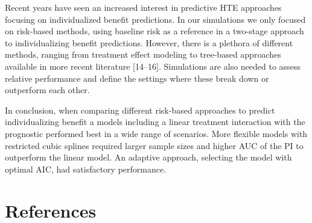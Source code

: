 \documentclass{article}
\begin{document}
Recent years have seen an increased interest in predictive HTE
approaches focusing on individualized benefit predictions. In our
simulations we only focused on risk-based methods, using baseline risk
as a reference in a two-stage approach to individualizing benefit
predictions. However, there is a plethora of different methods, ranging
from treatment effect modeling to tree-based approaches available in
more recent literature {[}14--16{]}. Simulations are also needed to
assess relative performance and define the settings where these break
down or outperform each other.

In conclusion, when comparing different risk-based approaches to predict
individualizing benefit a models including a linear treatment
interaction with the prognostic performed best in a wide range of
scenarios. More flexible models with restricted cubic splines required
larger sample sizes and higher AUC of the PI to outperform the linear
model. An adaptive approach, selecting the model with optimal AIC, had
satisfactory performance.

\newpage

\hypertarget{references}{%
\section{References}\label{references}}

\nolinenumbers
\setlength{\parindent}{-0.25in}
\setlength{\leftskip}{0.25in}

\noindent
\end{document}
